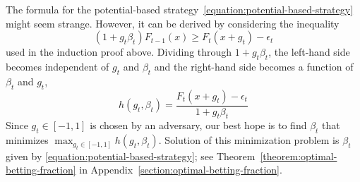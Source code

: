 \documentclass{colt2016_empty} %
\begin{document}
The formula for the potential-based
strategy~\eqref{equation:potential-based-strategy} might seem strange. However,
it can be derived by considering the inequality
$$
(1+g_t\beta_t) F_{t-1}(x) \ge F_{t}(x + g_t) - \epsilon_{t}
$$
used in the induction proof above. Dividing through $1+g_t\beta_t$, the left-hand
side becomes independent of $g_t$ and $\beta_t$ and the right-hand side becomes
a function of $\beta_t$ and $g_t$,
$$
h(g_t, \beta_t) = \frac{F_{t}(x + g_t)- \epsilon_{t}}{1 + g_t\beta_t}
$$
Since $g_t \in [-1,1]$ is chosen by an adversary, our best hope is to find
$\beta_t$ that minimizes $\max_{g_t \in [-1,1]} h(g_t,\beta_t)$. Solution of
this minimization problem is $\beta_t$ given by
\eqref{equation:potential-based-strategy}; see
Theorem~\ref{theorem:optimal-betting-fraction} in
Appendix~\ref{section:optimal-betting-fraction}.
\end{document}
